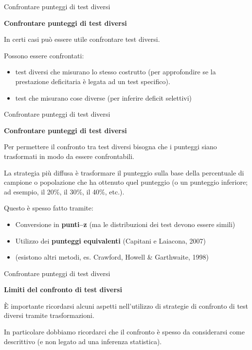 \documentclass[
  ignorenonframetext,
]{beamer}
\providecommand{\tightlist}{%
  \setlength{\itemsep}{0pt}\setlength{\parskip}{0pt}}
\begin{document}
\begin{frame}{Confrontare punteggi di test diversi}
\label{confrontare-punteggi-di-test-diversi}
\begin{center}
  \textbf{Confrontare punteggi di test diversi}
\end{center}
\vspace{2em}

In certi casi può essere utile confrontare test diversi.

Possono essere confrontati:

\begin{itemize}
\item
  test diversi che misurano lo stesso costrutto (per approfondire se la
  prestazione deficitaria è legata ad un test specifico).
\item
  test che misurano cose diverse (per inferire deficit selettivi)
\end{itemize}
\end{frame}

\begin{frame}{Confrontare punteggi di test diversi}
\label{confrontare-punteggi-di-test-diversi-1}
\begin{center}
  \textbf{Confrontare punteggi di test diversi}
\end{center}

Per permettere il confronto tra test diversi bisogna che i punteggi
siano trasformati in modo da essere confrontabili.

La strategia più diffusa è trasformare il punteggio sulla base della
percentuale di campione o popolazione che ha ottenuto quel punteggio (o
un punteggio inferiore; ad esempio, il 20\%, il 30\%, il 40\%, etc.).

Questo è spesso fatto tramite:

\begin{itemize}
\tightlist
\item
  Conversione in \textbf{punti--z} (ma le distribuzioni dei test devono
  essere simili)
\item
  Utilizzo dei \textbf{punteggi equivalenti} (Capitani e Laiacona, 2007)
\item
  (esistono altri metodi, es. Crawford, Howell \& Garthwaite, 1998)
\end{itemize}
\end{frame}

\begin{frame}{Confrontare punteggi di test diversi}
\label{confrontare-punteggi-di-test-diversi-2}
\begin{center}
  \textbf{Limiti del confronto di test diversi}
\end{center}
\vspace{2em}

È importante ricordarsi alcuni aspetti nell'utilizzo di strategie di
confronto di test diversi tramite trasformazioni.

In particolare dobbiamo ricordarci che il confronto è spesso da
considerarsi come descrittivo (e non legato ad una inferenza
statistica).
\end{frame}
\end{document}
